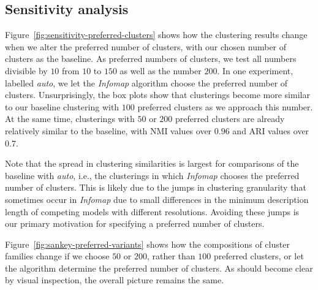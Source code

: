 \subsection{Sensitivity analysis}

Figure~\ref{fig:sensitivity-preferred-clusters} shows how the clustering results change when we alter the preferred number of clusters, 
with our chosen number of clusters as the baseline. 
As preferred numbers of clusters, we test all numbers divisible by $10$ from $10$ to $150$ as well as the number $200$. 
In one experiment, labelled \emph{auto}, we let the \emph{Infomap} algorithm choose the preferred number of clusters.
Unsurprisingly, the box plots show that clusterings become more similar to our baseline clustering with $100$ preferred clusters as we approach this number. 
At the same time, clusterings with $50$ or $200$ preferred clusters are already relatively similar to the baseline, with NMI values over $0.96$ and ARI values over $0.7$. 

Note that the spread in clustering similarities is largest for comparisons of the baseline with \emph{auto}, i.e., the clusterings in which \emph{Infomap} chooses the preferred number of clusters.
This is likely due to the jumps in clustering granularity that sometimes occur in \emph{Infomap} due to small differences in the minimum description length of competing models with different resolutions.
Avoiding these jumps is our primary motivation for specifying a preferred number of clusters.

Figure~\ref{fig:sankey-preferred-variants} shows how the compositions of cluster families change if we choose $50$ or $200$, rather than $100$ preferred clusters, or let the algorithm determine the preferred number of clusters.
As should become clear by visual inspection, the overall picture remains the same.

